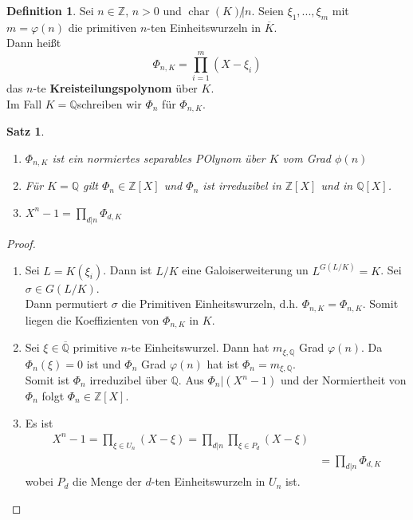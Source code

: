 \documentclass[10pt,a4paper]{article}
\newcommand{\Z}{\ensuremath{\mathbb{Z}}}
\newcommand{\Q}{\ensuremath{\mathbb{Q}}}
\newcommand{\ol}[1]{\overline{#1}}
\newcommand{\cha}{\operatorname{char}}
\theoremstyle{plain}
\newtheorem{satz}[theorem]{Satz}
\theoremstyle{definition}
\newtheorem{definition}[theorem]{Definition}
\theoremstyle{remark}
\begin{document}
	\begin{definition}
		Sei $n\in\Z$, $n>0$ und $\cha(K)\not|n$. Seien $\xi_1,...,\xi_m$ mit $m=\varphi(n)$ die primitiven $n$-ten Einheitswurzeln in $\ol K$.\\
		Dann heißt
		\[\Phi_{n,K}=\prod_{i=1}^{m}(X-\xi_i)\]
		das $n$-te \textbf{Kreisteilungspolynom} über $K$.\\
		Im Fall $K=\Q$schreiben wir $\Phi_n$ für $\Phi_{n,K}$.
	\end{definition}

	\begin{satz}
		\begin{enumerate}
			\item $\Phi_{n,K}$ ist ein normiertes separables POlynom über $K$ vom Grad $\phi(n)$
			\item Für $K=\Q$ gilt $\Phi_n\in\Z[X]$ und $\Phi_n$ ist irreduzibel in $\Z[X]$ und in $\Q[X]$.
			\item $X^n-1=\prod_{d|n}\Phi_{d,K}$
		\end{enumerate}
	\end{satz}
	\begin{proof}
		\begin{enumerate}
			\item Sei $L=K(\xi_i)$. Dann ist $L/K$ eine Galoiserweiterung un $L^{G(L/K)}=K$. Sei $\sigma\in G(L/K)$.\\
			Dann permutiert $\sigma$ die Primitiven Einheitswurzeln, d.h. $\Phi_{n,K}=\Phi_{n,K}$. Somit liegen die Koeffizienten von $\Phi_{n,K}$ in $K$.
			\item Sei $\xi\in\ol \Q$ primitive $n$-te Einheitswurzel. Dann hat $m_{\xi,\Q}$ Grad $\varphi(n)$. Da $\Phi_n(\xi)=0$ ist und $\Phi_n$ Grad $\varphi(n)$ hat ist $\Phi_n=m_{\xi,\Q}$.\\
			Somit ist $\Phi_n$ irreduzibel über $\Q$. Aus $\Phi_n|(X^n-1)$ und der Normiertheit von $\Phi_n$ folgt $\Phi_n\in\Z[X]$.
			\item Es ist
			\begin{align*}
			X^n-1=\prod_{\xi\in U_n}(X-\xi)=\prod_{d|n}\prod_{\xi\in P_d}(X-\xi)\\
			&=\prod_{d|n}\Phi_{d,K}
			\end{align*} 
			wobei $P_d$ die Menge der $d$-ten Einheitswurzeln in $U_n$ ist.
		\end{enumerate}
	\end{proof}
\end{document}

